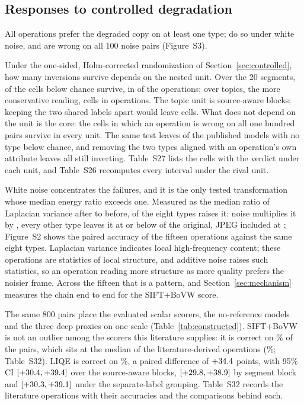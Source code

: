 \subsection{Responses to controlled degradation}\label{sec:class}

All \fontesDaLiteratura{} operations prefer the degraded copy on at least one type;
\resRuido{} do so under white noise, and \resZeroRuido{} are wrong on all 100 noise pairs
(Figure~S3).

Under the one-sided, Holm-corrected randomization of Section~\ref{sec:controlled}, how many inversions survive depends on the nested unit. Over the 20 segments, \invSig{} of the \invCelulas{}
cells below chance survive, in \invOpsSig{} of the \fontesDaLiteratura{} operations;
over topics, the more conservative reading, \invSigTop{} cells in \invOpsSigTop{}
operations. The topic unit is \invBlocos{} source-aware blocks; keeping the two shared
labels apart would leave \invSigRotulo{} cells. What does not depend on the unit is the core: the
\invPerfeitas{} cells in which an operation is wrong on all one hundred pairs survive in every unit. The same test leaves
\invModelosLimpos{} of the \invModelos{} published models with no type below chance, and
removing the two types aligned with an operation's own attribute leaves all
\tipoSemAlinhados{} still inverting. Table~S27 lists the \invCelulas{} cells with the
verdict under each unit, and Table~S26 recomputes every interval under the rival unit.

White noise concentrates the failures, and it is the only tested transformation
whose median energy ratio exceeds one. Measured as the median ratio of Laplacian
variance after to before, \eneAdicionam{} of the eight types raises it: noise multiplies
it by \eneRuido{},
every other type leaves it at or below \eneMaiorSemRuido{} of the original, JPEG included at \eneJpeg{}; Figure~S2 shows the paired accuracy of the fifteen operations against the same eight types. Laplacian variance indicates local high-frequency content; these operations are statistics of local
structure, and additive noise raises such statistics, so an operation reading more
structure as more quality prefers the noisier frame. Across the fifteen that is a pattern, and Section~\ref{sec:mechanism} measures the chain end to end for the SIFT+BoVW score.

The same 800 pairs place the evaluated scalar scorers, the no-reference models and the three deep proxies on one scale (Table~\ref{tab:constructed}). SIFT+BoVW is not an outlier among the scorers this
literature supplies: it is correct on \mchImplantada{}\%
of the pairs, which sits at the median of the literature-derived operations
(\tipMediana{}\%; Table~S32). LIQE is correct on \mchLiqe{}\%, a paired difference of
$+34.4{}$ points, with 95\% CI $[+30.4, +39.4]{}$ over the \mchTopicos{} source-aware blocks, $[+29.8, +38.9]{}$ by segment block and $[+30.3, +39.1]{}$ under the separate-label grouping. Table~S32 records the literature operations with their
accuracies and the comparisons behind each.


